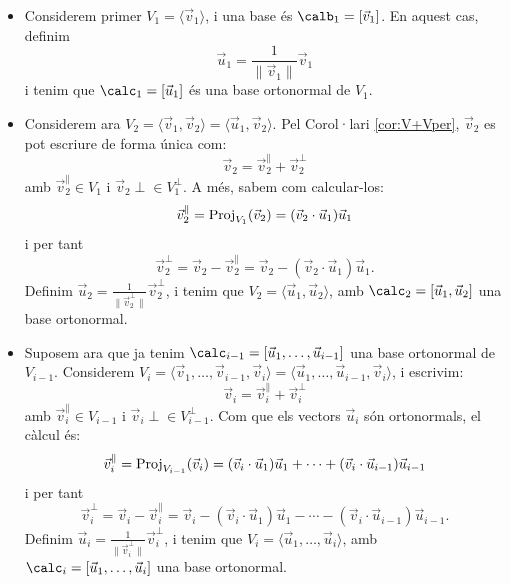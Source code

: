 \begin{itemize}
    \item Considerem primer $V_1=\langle \vec v_1 \rangle$, i una base és $\calb_1=[\vec v_1]$. En aquest cas, definim 
    \[\vec u_1=\frac{1}{\|\vec v_1\|} \vec v_1\]
    i tenim que $\calc_1=[\vec u_1]$ és una base ortonormal de $V_1$.
    \item Considerem ara $V_2=\langle \vec v_1, \vec v_2 \rangle=\langle \vec u_1, \vec v_2 \rangle$. Pel Corol·lari \ref{cor:V+Vper}, $\vec v_2$ es pot escriure de forma única com:
    \[
    \vec v_2 = \vec v_2^\parallel + \vec v_2^\perp
    \]
    amb $\vec v_2^\parallel\in V_1$ i $\vec v_2\perp \in V_1^\perp$. A més, sabem com calcular-los:
    \[
    \vec v_2^\parallel = \operatorname{Proj}_{V_1}(\vec v_2)=(\vec v_2 \cdot \vec u_1)\vec u_1
    \]
    i per tant
    \[
    \vec v_2^\perp = \vec v_2 - \vec v_2^\parallel = \vec v_2 - (\vec v_2 \cdot \vec u_1)\vec u_1.
    \]
    Definim $\vec u_2=\frac{1}{\|\vec v_2^\perp\|}\vec v_2^\perp$, i tenim que $V_2=\langle \vec u_1, \vec u_2\rangle$, amb $\calc_2=[\vec u_1,\vec u_2]$ una base ortonormal.
    \item Suposem ara que ja tenim $\calc_{i-1}=[\vec u_1, \dots, \vec u_{i-1}]$ una base ortonormal de $V_{i-1}$. Considerem $V_i=\langle\vec v_1, \dots, \vec v_{i-1},\vec v_i\rangle=\langle\vec u_1, \dots, \vec u_{i-1},\vec v_i\rangle$, i escrivim:
    \[
    \vec v_i = \vec v_i^\parallel + \vec v_i^\perp
    \]
    amb $\vec v_i^\parallel\in V_{i-1}$ i $\vec v_i\perp \in V_{i-1}^\perp$. Com que els vectors $\vec u_i$ són ortonormals, el càlcul és:
    \[
    \vec v_i^\parallel = \operatorname{Proj}_{V_{i-1}}(\vec v_i)=(\vec v_i \cdot \vec u_1)\vec u_1+ \cdots + (\vec v_i \cdot \vec u_{i-1})\vec u_{i-1}
    \]
    i per tant
    \[
    \vec v_i^\perp = \vec v_i - \vec v_i^\parallel = \vec v_i - (\vec v_i \cdot \vec u_1)\vec u_1- \cdots -(\vec v_i \cdot \vec u_{i-1})\vec u_{i-1}.
    \]
    Definim $\vec u_i=\frac{1}{\|\vec v_i^\perp\|}\vec v_i^\perp$, i tenim que $V_i=\langle \vec u_1, \dots ,\vec u_i\rangle$, amb $\calc_i=[\vec u_1,\dots,\vec u_i]$ una base ortonormal.
\end{itemize}
